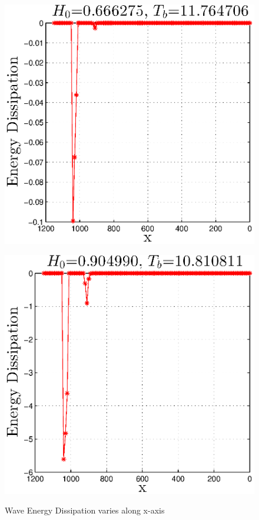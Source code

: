 \begin{figure}[H]
\begin{minipage}[b]{0.47\linewidth}
\centering
\includegraphics[width=\textwidth]{forward_plot/p1_7.eps}
\label{FigE_1}
\end{minipage}
\hspace{0.4cm}
\begin{minipage}[b]{0.47\linewidth}
\centering
\includegraphics[width=\textwidth]{forward_plot/p2_7.eps}
\label{FigE_2}
\end{minipage}
\caption{Wave Energy Dissipation varies along x-axis}
\end{figure}
